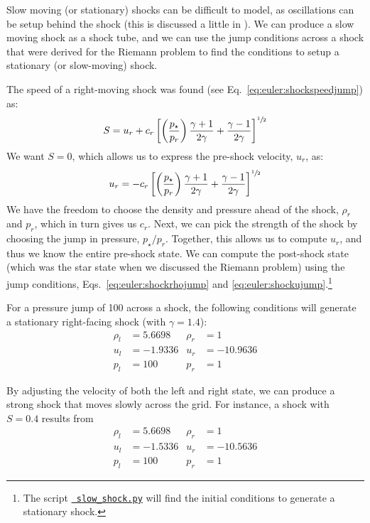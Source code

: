 Slow moving (or stationary) shocks can be difficult to model, as
oscillations can be setup behind the shock (this is discussed a little
in \cite{colellawoodward:1984,leveque:2002}).  We can produce a slow
moving shock as a shock tube, and we can use the jump conditions 
across a shock that were derived for the Riemann problem to find the
conditions to setup a stationary (or slow-moving) shock.  

The speed of a right-moving shock was found (see
Eq.~\ref{eq:euler:shockspeedjump}) as:
\begin{equation}
S = u_r + c_r \left [ \left ( \frac{p_\star}{p_r} \right ) \frac{\gamma+1}{2\gamma} + \frac{\gamma-1}{2\gamma} \right ]^{{\sfrac{1}{2}}}
\end{equation}
We want $S = 0$, which allows us to express the pre-shock velocity, $u_r$, as:
\begin{equation}
u_r = -c_r \left [ \left ( \frac{p_\star}{p_r} \right ) \frac{\gamma+1}{2\gamma} + \frac{\gamma-1}{2\gamma} \right ]^{{\sfrac{1}{2}}}
\end{equation}
We have the freedom to choose the density and pressure ahead of the
shock, $\rho_r$ and $p_r$, which in turn gives us $c_r$.  Next, we can
pick the strength of the shock by choosing the jump in pressure,
$p_\star/p_r$.  Together, this allows us to compute $u_r$, and thus we
know the entire pre-shock state.  We can compute the post-shock state
(which was the star state when we discussed the Riemann problem) using
the jump conditions, Eqs.~\ref{eq:euler:shockrhojump} and
\ref{eq:euler:shockujump}.\footnote{The script
  \href{https://github.com/zingale/hydro_examples/blob/master/compressible/slow_shock.py}{\tt
    slow\_shock.py} will find the initial conditions to generate a
  stationary shock.}

For a pressure jump of 100 across a shock, the following conditions will
generate a stationary right-facing shock (with $\gamma = 1.4$):
\begin{align}
\rho_l &= 5.6698      &  \rho_r &= 1 \nonumber \\
u_l   &= -1.9336      &  u_r    &= -10.9636   \\
p_l    &= 100         &  p_r    &= 1 \nonumber
\end{align}

By adjusting the velocity of both the left and right state, we can
produce a strong shock that moves slowly across the grid.  For
instance, a shock with $S = 0.4$ results from
\begin{align}
\rho_l &= 5.6698      &  \rho_r &= 1 \nonumber \\
u_l   &= -1.5336      &  u_r    &= -10.5636   \\
p_l    &= 100         &  p_r    &= 1 \nonumber
\end{align}

